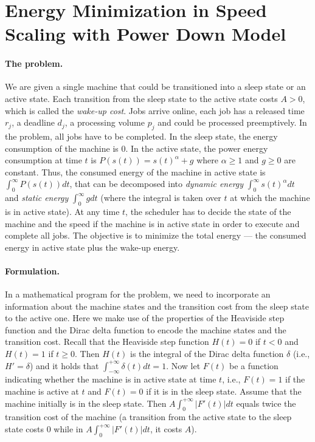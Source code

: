 \documentclass[11pt]{article}
\begin{document}
\section{Energy Minimization in Speed Scaling with Power Down Model}		\label{sec:4S-energy}
\paragraph{The problem.} 
We are given a single machine that could be transitioned into 
a sleep state or an active state.  Each transition from the sleep state to 
the active state costs $A > 0$, which is called the \emph{wake-up cost}. 
Jobs arrive online, each job has a released time $r_{j}$, a deadline $d_{j}$, 
a processing volume $p_{j}$ and could be processed preemptively. In the problem,
all jobs have to be completed. In the sleep state, the energy consumption of the machine is 0.
In the active state, the power energy consumption at time $t$ is $P(s(t)) = s(t)^{\alpha} + g$
where $\alpha \geq 1$ and $g \geq 0$ are constant. Thus, the consumed energy of the machine 
in active state is $\int_{0}^{\infty} P(s(t))dt$, that can be decomposed into 
\emph{dynamic energy} $\int_{0}^{\infty} s(t)^{\alpha}dt$ and 
\emph{static energy} $\int_{0}^{\infty} g dt$ (where the integral is taken over $t$ at which 
the machine is in active state). At any time $t$, 
the scheduler has to decide the state of the machine and the speed if the machine is in active state 
in order to execute and complete all jobs. 
The objective is to minimize the total energy --- the consumed energy in active state plus the 
wake-up energy. 

\paragraph{Formulation.} In a mathematical program for the problem, we need to incorporate an information 
about the machine states and the transition cost from the sleep state to the active one.  
Here we make use of 
the properties of the Heaviside step function and the Dirac delta function to encode 
the machine states and the transition cost. Recall that the Heaviside step 
function $H(t) = 0$ if $t < 0$ and $H(t) = 1$ if $t \geq 0$. Then $H(t)$
is the integral of the Dirac delta function $\delta$ (i.e., $H' = \delta$) and it holds that 
$\int_{-\infty}^{+\infty} \delta(t)dt = 1$. Now let $F(t)$ be a function
indicating whether the machine is in active state at time $t$, i.e., $F(t) = 1$ if 
the machine is active at $t$ and $F(t) = 0$ if it is in the sleep state. 
Assume that the machine initially is in the sleep state. Then
$A \int_{0}^{+\infty} |F'(t)|dt$ equals twice the transition cost
of the machine (a transition from the active state to the sleep state costs 0 while 
in $A \int_{0}^{+\infty} |F'(t)|dt$, it costs $A$).
\end{document}
